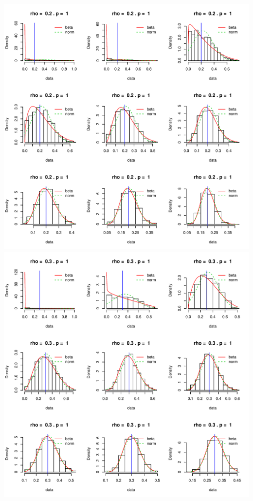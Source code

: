 \documentclass[]{article}
\begin{document}
\includegraphics{2016_w09_files/figure-latex/unnamed-chunk-13-3.pdf}
\includegraphics{2016_w09_files/figure-latex/unnamed-chunk-13-4.pdf}
\end{document}
